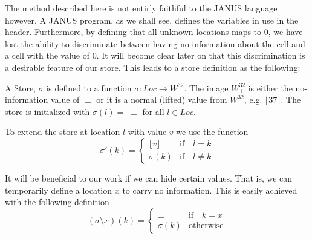 The method described here is not entirly faithful to the JANUS
language however. A JANUS program, as we shall see, defines the
variables in use in the header. Furthermore, by defining that all
unknown locations maps to $0$, we have lost the ability to
discriminate between having no information about the cell and a cell
with the value of $0$. It will become clear later on that this
discrimination is a desirable feature of our store. This leads to a
store definition as the following:
\newcommand{\lift}[1]{\lfloor #1 \rfloor}
\begin{defn}
  A Store, $\sigma$ is defined to a function $\sigma \colon Loc \to
  W^{32}_\perp$. The image $W^{32}_\perp$ is either the no-information
  value of $\perp$ or it is a normal (lifted) value from $W^{32}$,
  e.g. $\lift{37}$. The store is initialized with $\sigma(l) = \;\perp$
  for all $l \in Loc$.

  To extend the store at location $l$ with value $v$ we use the
  function
  \begin{equation*}
    \sigma'(k) = \begin{cases}
      \lift{v}& \text{if}\quad l = k\\
      \sigma(k)& \text{if}\quad l \neq k
      \end{cases}
  \end{equation*}
\end{defn}
It will be beneficial to our work if we can hide certain values. That
is, we can temporarily define a location $x$ to carry no
information. This is easily achieved with the following definition
\begin{equation*}
  (\sigma \setminus x)(k) = \begin{cases}
    \perp& \text{if}\quad k = x\\
    \sigma(k)& \text{otherwise}
  \end{cases}
\end{equation*}

